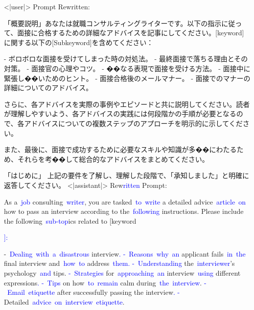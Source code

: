 \documentclass{article}
\begin{document}
\begin{tcolorbox}[colframe=black,colback=white]
<|user|>
Prompt Rewritten:

「概要説明」あなたは就職コンサルティングライターです。以下の指示に従って、面接に合格するための詳細なアドバイスを記事にしてください。[keyword]に関する以下の[Subkeyword]を含めてください：

- ボロボロな面接を受けてしまった時の対処法。
- 最終面接で落ちる理由とその対策。
- 面接官の心理やコツ。
- ��なる表現で面接を受ける方法。
- 面接中に緊張し��いためのヒント。
- 面接合格後のメールマナー。
- 面接でのマナーの詳細についてのアドバイス。

さらに、各アドバイスを実際の事例やエピソードと共に説明してください。読者が理解しやすいよう、各アドバイスの実践には何段階かの手順が必要となるので、各アドバイスについての複数ステップのアプローチを明示的に示してください。

また、最後に、面接で成功するために必要なスキルや知識が多��にわたるため、それらを考��して総合的なアドバイスをまとめてください。

「はじめに」
上記の要件を了解し、理解した段階で、「承知しました」と明確に返答してください。
<|assistant|>
Rew\textcolor{blue}{ritten} Prompt:

As a\textcolor{blue}{~job} consulting\textcolor{blue}{~writer}, you are tasked\textcolor{blue}{~to}\textcolor{blue}{~write} a detailed advice\textcolor{blue}{~article}\textcolor{blue}{~on} how to pass an interview according to the\textcolor{blue}{~following} instructions. Please include the following\textcolor{blue}{~sub}\textcolor{blue}{-top}ics related to [keyword\textcolor{blue}{]:

}-\textcolor{blue}{~De}\textcolor{blue}{aling}\textcolor{blue}{~with}\textcolor{blue}{~a}\textcolor{blue}{~disastrous} interview\textcolor{blue}{.
}\textcolor{blue}{-}\textcolor{blue}{~Reasons}\textcolor{blue}{~why}\textcolor{blue}{~an} applicant fails\textcolor{blue}{~in}\textcolor{blue}{~the} final interview and\textcolor{blue}{~how}\textcolor{blue}{~to} address\textcolor{blue}{~them}\textcolor{blue}{.
}\textcolor{blue}{-}\textcolor{blue}{~Understanding} the\textcolor{blue}{~interviewer}'s psychology\textcolor{blue}{~and} tips.
\textcolor{blue}{-}\textcolor{blue}{~Strategies} for\textcolor{blue}{~approaching}\textcolor{blue}{~an} interview\textcolor{blue}{~using} different expressions\textcolor{blue}{.
}\textcolor{blue}{-}\textcolor{blue}{~Tips} on how\textcolor{blue}{~to}\textcolor{blue}{~remain} calm during\textcolor{blue}{~the}\textcolor{blue}{~interview}.
\textcolor{blue}{-}\textcolor{blue}{~Email}\textcolor{blue}{~etiquette} after successfully passing the interview\textcolor{blue}{.
}\textcolor{blue}{-} Detailed\textcolor{blue}{~advice}\textcolor{blue}{~on}\textcolor{blue}{~interview}\textcolor{blue}{~etiquette}.


\end{tcolorbox}
\end{document}
